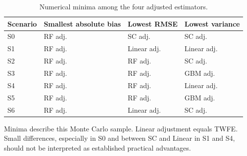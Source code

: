 \begin{table}[htbp]
\centering\small
\caption{Numerical minima among the four adjusted estimators.}\label{tab:ranking}
\begin{tabular}{llll}
\toprule
Scenario & Smallest absolute bias & Lowest RMSE & Lowest variance \\
\midrule
S0 & RF adj. & SC adj. & SC adj. \\
S1 & RF adj. & Linear adj. & Linear adj. \\
S2 & RF adj. & RF adj. & SC adj. \\
S3 & RF adj. & RF adj. & GBM adj. \\
S4 & RF adj. & RF adj. & Linear adj. \\
S5 & RF adj. & RF adj. & GBM adj. \\
S6 & RF adj. & Linear adj. & SC adj. \\
\bottomrule
\end{tabular}
\par\smallskip\begin{minipage}{0.94\linewidth}\footnotesize Minima describe this Monte Carlo sample. Linear adjustment equals TWFE. Small differences, especially in S0 and between SC and Linear in S1 and S4, should not be interpreted as established practical advantages.\end{minipage}
\end{table}